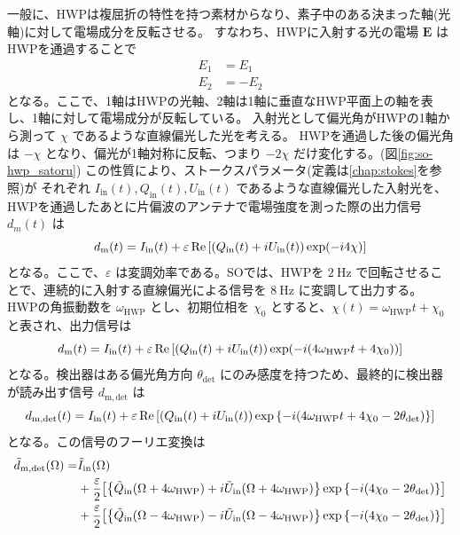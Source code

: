 \documentclass[../../main.tex]{subfiles}
\begin{document}
一般に、HWPは複屈折の特性を持つ素材からなり、素子中のある決まった軸(光軸)に対して電場成分を反転させる。
すなわち、HWPに入射する光の電場 $\bm{E}$ はHWPを通過することで
\begin{align}
    E_{1} &= E_{1} \\
    E_{2} &= -E_{2}
\end{align}
となる。ここで、1軸はHWPの光軸、2軸は1軸に垂直なHWP平面上の軸を表し、1軸に対して電場成分が反転している。
入射光として偏光角がHWPの1軸から測って $\chi$ であるような直線偏光した光を考える。
HWPを通過した後の偏光角は $-\chi$ となり、偏光が1軸対称に反転、つまり $-2\chi$ だけ変化する。(図\ref{fig:so-hwp_satoru})
この性質により、ストークスパラメータ(定義は\ref{chap:stokes}を参照)が
それぞれ $I_{\mathrm{in}}(t), Q_{\mathrm{in}}(t), U_{\mathrm{in}}(t)$ であるような直線偏光した入射光を、
HWPを通過したあとに片偏波のアンテナで電場強度を測った際の出力信号 $d_m(t)$ は
\begin{equation}
    d_{\mathrm{m}}(t) = I_{\mathrm{in}}(t) + \varepsilon\Re\qty[\qty(Q_{\mathrm{in}}(t)+iU_{\mathrm{in}}(t))\exp(-i 4\chi)]
\end{equation}
となる。ここで、$\varepsilon$ は変調効率である。SOでは、HWPを $2\ \mathrm{Hz}$ で回転させることで、連続的に入射する直線偏光による信号を $8\ \mathrm{Hz}$ に変調して出力する。
HWPの角振動数を $\omega_{\mathrm{HWP}}$ とし、初期位相を $\chi_0$ とすると、$\chi(t) = \omega_{\mathrm{HWP}}t + \chi_{0}$ と表され、出力信号は
\begin{equation}
    d_{\mathrm{m}}(t) = I_{\mathrm{in}}(t) + \varepsilon\Re\qty[\qty(Q_{\mathrm{in}}(t)+iU_{\mathrm{in}}(t))\exp(-i \qty(4\omega_{\mathrm{HWP}}t + 4\chi_0))]
\end{equation}
となる。検出器はある偏光角方向 $\theta_{\mathrm{det}}$ にのみ感度を持つため、最終的に検出器が読み出す信号 $d_{\mathrm{m}, \mathrm{det}}$ は
\begin{equation}
    \label{eq:so-hwp_modulation}
    d_{\mathrm{m}, \mathrm{det}}(t) = I_{\mathrm{in}}(t) + \varepsilon\Re\qty[\qty(Q_{\mathrm{in}}(t)+iU_{\mathrm{in}}(t))\exp\qty{-i \qty(4\omega_{\mathrm{HWP}}t + 4\chi_0 - 2\theta_{\mathrm{det}})}]
\end{equation}
となる。この信号のフーリエ変換は
\begin{equation}
    \label{eq:so-hwp_fourier}
    \begin{split}
        \tilde{d}_{\mathrm{m}, \mathrm{det}}(\Omega) = &\tilde{I}_{\mathrm{in}}(\Omega) \\
            &+ \dfrac{\varepsilon}{2}\qty[\qty{\tilde{Q}_{\mathrm{in}}(\Omega+4\omega_{\mathrm{HWP}})+i\tilde{U}_{\mathrm{in}}(\Omega+4\omega_{\mathrm{HWP}})}\exp\qty{-i\qty(4\chi_0 - 2\theta_{\mathrm{det}})}] \\
            &+ \dfrac{\varepsilon}{2}\qty[\qty{\tilde{Q}_{\mathrm{in}}(\Omega-4\omega_{\mathrm{HWP}})-i\tilde{U}_{\mathrm{in}}(\Omega-4\omega_{\mathrm{HWP}})}\exp\qty{-i\qty(4\chi_0 - 2\theta_{\mathrm{det}})}]
    \end{split}
\end{equation}
\end{document}

